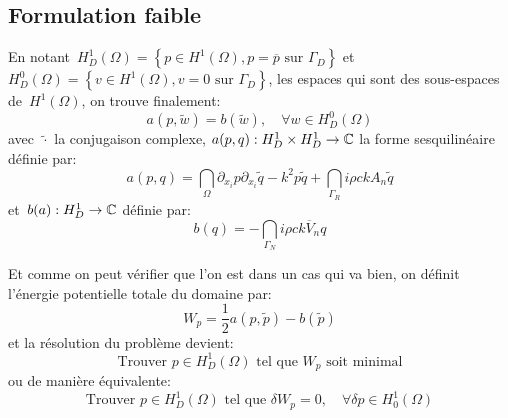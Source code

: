 \subsection{Formulation faible}
En notant~$H^1_D(\Omega)=\left\{p\in H^1(\Omega), p=\overline{p} \text{ sur } \Gamma_D\right\}$ et $H^0_D(\Omega)=\left\{v\in H^1(\Omega), v=0 \text{ sur } \Gamma_D\right\}$, les espaces qui sont des sous-espaces de~$H^1(\Omega)$, on trouve finalement:
\begin{equation}
a(p,\tilde{w})=b(\tilde{w}), \quad \forall w\in H^0_D(\Omega)
\end{equation}
avec~$\tilde{\cdot}$ la conjugaison complexe, $a(p,q): H^1_D\times H^1_D \rightarrow \mathbb C$ la forme sesquilinéaire définie par:
\begin{equation}\label{Eq-Helmacomplex}
a(p,q)=\dint_\Omega \partial_{x_i}p\partial_{x_i}\tilde{q}-k^2p\tilde{q} +
\dint_{\Gamma_R} i\rho ckA_n\tilde{q}
\end{equation}
et~$b(a): H^1_D\rightarrow\mathbb C$ définie par:
\begin{equation}\label{Eq-Helmbcomplex}
b(q)=-\dint_{\Gamma_N} i\rho c k\overline{V}_n q
\end{equation}

\medskip
Et comme on peut vérifier que l'on est dans un cas qui va bien, on définit l'énergie potentielle totale du domaine par:
\begin{equation}
W_p=\frac12 a(p,\tilde{p})-b(\tilde{p})
\end{equation}
et la résolution du problème devient:
\begin{equation}
\text{Trouver } p\in H^1_D(\Omega) \text{ tel que } W_p \text{ soit minimal}
\end{equation}
ou de manière équivalente:
\begin{equation}
\text{Trouver } p\in H^1_D(\Omega) \text{ tel que } \delta W_p=0,\quad \forall\delta p\in H^1_0(\Omega)
\end{equation} 